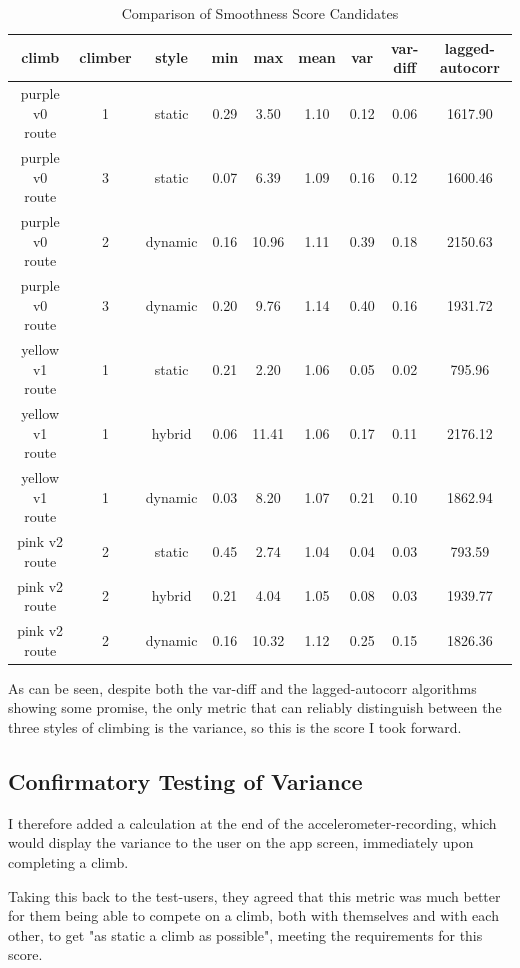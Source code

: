 \begin{table}[h]
\centering
\begin{tabular}{|c|c|c|c|c|c|c|c|c|}
\hline
climb  &  climber & style & min & max & mean & var & var-diff & lagged-autocorr \\ \hline
purple v0 route & 1 & static  & 0.29 & 3.50 & 1.10 & 0.12 & 0.06 & 1617.90 \\ \hline
purple v0 route & 3 & static  & 0.07 & 6.39 & 1.09 & 0.16 & 0.12 & 1600.46 \\ \hline
purple v0 route & 2 & dynamic & 0.16 & 10.96 & 1.11 & 0.39 & 0.18 & 2150.63 \\ \hline
purple v0 route & 3 & dynamic & 0.20 & 9.76 & 1.14 & 0.40 & 0.16 & 1931.72 \\ \hline
yellow v1 route & 1 & static  & 0.21 & 2.20 & 1.06 & 0.05 & 0.02 & 795.96 \\ \hline
yellow v1 route & 1 & hybrid & 0.06 & 11.41 & 1.06 & 0.17 & 0.11 & 2176.12 \\ \hline
yellow v1 route & 1 & dynamic & 0.03 & 8.20 & 1.07 & 0.21 & 0.10 & 1862.94 \\ \hline
pink v2 route & 2 & static & 0.45 & 2.74 & 1.04 & 0.04 & 0.03 & 793.59 \\ \hline
pink v2 route & 2 & hybrid & 0.21 & 4.04 & 1.05 & 0.08 & 0.03 & 1939.77 \\ \hline
pink v2 route & 2 & dynamic & 0.16 & 10.32 & 1.12 & 0.25 & 0.15 & 1826.36 \\ \hline

\end{tabular}
\caption{Comparison of Smoothness Score Candidates}
\label{tab:smoothnesses}
\end{table}

As can be seen, despite both the var-diff and the lagged-autocorr algorithms showing some promise, the only metric that can reliably distinguish between the three styles of climbing is the variance, so this is the score I took forward.


\subsection{Confirmatory Testing of Variance}
I therefore added a calculation at the end of the accelerometer-recording, which would display the variance to the user on the app screen, immediately upon completing a climb.

Taking this back to the test-users, they agreed that this metric was much better for them being able to compete on a climb, both with themselves and with each other, to get "as static a climb as possible", meeting the requirements for this score.

